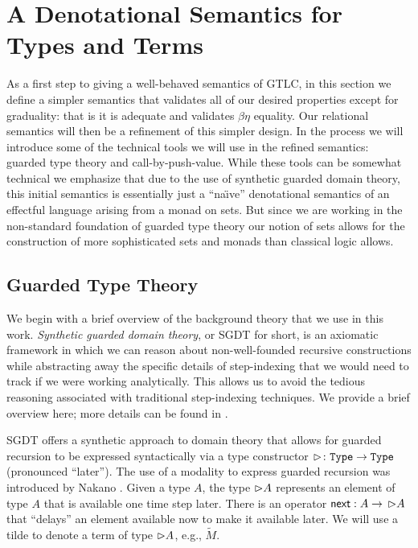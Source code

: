 \section{A Denotational Semantics for Types and Terms}\label{sec:concrete-term-model}

As a first step to giving a well-behaved semantics of GTLC, in this
section we define a simpler semantics that validates all of our
desired properties except for graduality: that is it is adequate and
validates $\beta\eta$ equality. Our relational semantics will then be
a refinement of this simpler design. In the process we will introduce
some of the technical tools we will use in the refined semantics:
guarded type theory and call-by-push-value. While these tools can be
somewhat technical we emphasize that due to the use of synthetic
guarded domain theory, this initial semantics is essentially just a
``na\"\i ve'' denotational semantics of an effectful language arising
from a monad on sets. But since we are working in the non-standard
foundation of guarded type theory our notion of sets allows for the
construction of more sophisticated sets and monads than classical
logic allows.

%

\subsection{Guarded Type Theory}

We begin with a brief overview of the background theory that we use in this work.
\emph{Synthetic guarded domain theory}, or SGDT for
short, is an axiomatic framework in which we can reason about non-well-founded
recursive constructions while abstracting away the specific details of
step-indexing that we would need to track if we were working analytically. This
allows us to avoid the tedious reasoning associated with traditional
step-indexing techniques. We provide a brief overview here; more details can be
found in \cite{birkedal-mogelberg-schwinghammer-stovring2011}.

SGDT offers a synthetic approach to domain theory that allows for guarded
recursion to be expressed syntactically via a type constructor ${\vartriangleright} \colon
\texttt{Type} \to \texttt{Type}$ (pronounced ``later''). The use of a modality to express
guarded recursion was introduced by Nakano \cite{Nakano2000}.
%
Given a type $A$, the type ${\vartriangleright} A$ represents an element of type $A$ that is
available one time step later. There is an operator $\mathsf{next} : A \to\, {\vartriangleright} A$
that ``delays'' an element available now to make it available later. We will use
a tilde to denote a term of type ${\vartriangleright} A$, e.g., $\tilde{M}$.

